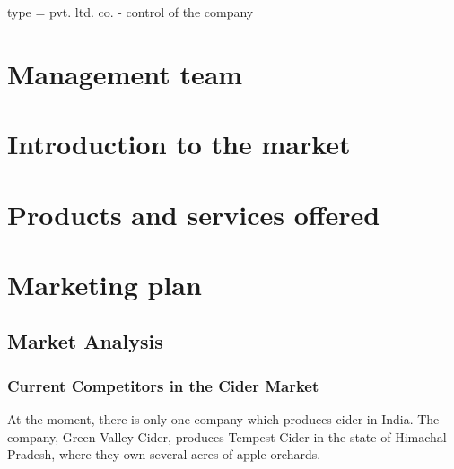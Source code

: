 \documentclass{article}
\begin{document}
type = pvt. ltd. co. - control of the company

\section{Management team}

\section{Introduction to the market}
\section{Products and services offered}
\section{Marketing plan}

\subsection{Market Analysis}
\subsubsection{Current Competitors in the Cider Market}
At the moment, there is only one company which produces cider in India.
The company, Green Valley Cider, produces Tempest Cider in the state of Himachal
Pradesh, where they own several acres of apple orchards.
\end{document}
